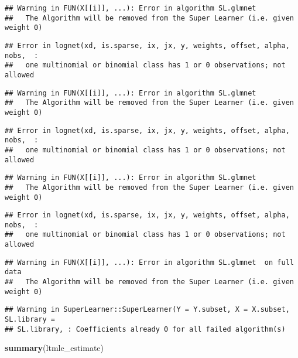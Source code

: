 \documentclass[
]{article}
\newenvironment{Shaded}{\begin{snugshade}}{\end{snugshade}}
\newcommand{\FunctionTok}[1]{\textcolor[rgb]{0.13,0.29,0.53}{\textbf{#1}}}
\newcommand{\NormalTok}[1]{#1}
\begin{document}
\begin{verbatim}
## Warning in FUN(X[[i]], ...): Error in algorithm SL.glmnet 
##   The Algorithm will be removed from the Super Learner (i.e. given weight 0)
\end{verbatim}

\begin{verbatim}
## Error in lognet(xd, is.sparse, ix, jx, y, weights, offset, alpha, nobs,  : 
##   one multinomial or binomial class has 1 or 0 observations; not allowed
\end{verbatim}

\begin{verbatim}
## Warning in FUN(X[[i]], ...): Error in algorithm SL.glmnet 
##   The Algorithm will be removed from the Super Learner (i.e. given weight 0)
\end{verbatim}

\begin{verbatim}
## Error in lognet(xd, is.sparse, ix, jx, y, weights, offset, alpha, nobs,  : 
##   one multinomial or binomial class has 1 or 0 observations; not allowed
\end{verbatim}

\begin{verbatim}
## Warning in FUN(X[[i]], ...): Error in algorithm SL.glmnet 
##   The Algorithm will be removed from the Super Learner (i.e. given weight 0)
\end{verbatim}

\begin{verbatim}
## Error in lognet(xd, is.sparse, ix, jx, y, weights, offset, alpha, nobs,  : 
##   one multinomial or binomial class has 1 or 0 observations; not allowed
\end{verbatim}

\begin{verbatim}
## Warning in FUN(X[[i]], ...): Error in algorithm SL.glmnet  on full data 
##   The Algorithm will be removed from the Super Learner (i.e. given weight 0)
\end{verbatim}

\begin{verbatim}
## Warning in SuperLearner::SuperLearner(Y = Y.subset, X = X.subset, SL.library =
## SL.library, : Coefficients already 0 for all failed algorithm(s)
\end{verbatim}

\begin{Shaded}
\begin{Highlighting}[]
\FunctionTok{summary}\NormalTok{(ltmle\_estimate)}
\end{Highlighting}
\end{Shaded}
\end{document}
